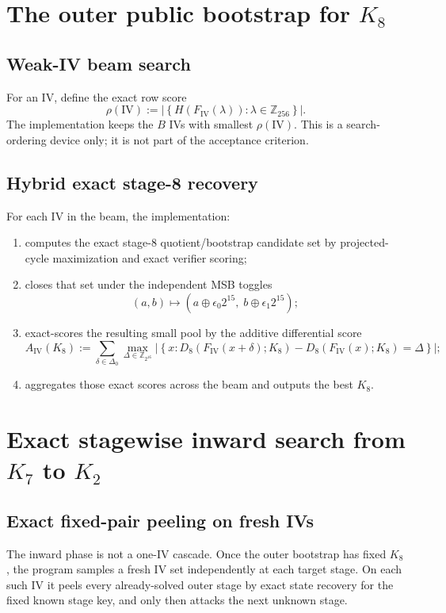 \documentclass[11pt]{article}
\newcommand{\Z}[1]{\mathbb{Z}_{#1}}
\begin{document}
\section{The outer public bootstrap for \texorpdfstring{$K_8$}{K8}}
\subsection{Weak-IV beam search}
For an IV, define the exact row score
\[
\rho(\mathrm{IV})
:=
\left|
\left\{
H(F_{\mathrm{IV}}(\lambda)):\lambda\in\Z{256}
\right\}
\right|.
\]
The implementation keeps the $B$ IVs with smallest $\rho(\mathrm{IV})$. This is a search-ordering device only; it is not part of the acceptance criterion.

\subsection{Hybrid exact stage-8 recovery}
For each IV in the beam, the implementation:
\begin{enumerate}[label=\arabic*.,leftmargin=1.5em]
\item computes the exact stage-8 quotient/bootstrap candidate set by projected-cycle maximization and exact verifier scoring;
\item closes that set under the independent MSB toggles
\[
(a,b)\mapsto(a\oplus \epsilon_0 2^{15},\;b\oplus \epsilon_1 2^{15});
\]
\item exact-scores the resulting small pool by the additive differential score
\[
A_{\mathrm{IV}}(K_8)
:=
\sum_{\delta\in\Delta_0}
\max_{\Delta\in\Z{2^{16}}}
\left|
\left\{
x:
D_8(F_{\mathrm{IV}}(x+\delta);K_8)-D_8(F_{\mathrm{IV}}(x);K_8)=\Delta
\right\}
\right|;
\]
\item aggregates those exact scores across the beam and outputs the best $K_8$.
\end{enumerate}

\section{Exact stagewise inward search from \texorpdfstring{$K_7$}{K7} to \texorpdfstring{$K_2$}{K2}}
\subsection{Exact fixed-pair peeling on fresh IVs}
The inward phase is not a one-IV cascade. Once the outer bootstrap has fixed $K_8$, the program samples a fresh IV set independently at each target stage. On each such IV it peels every already-solved outer stage by exact state recovery for the fixed known stage key, and only then attacks the next unknown stage.
\end{document}
